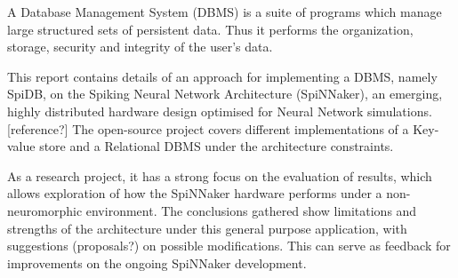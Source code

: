 A Database Management System (DBMS) is a suite of programs which manage large structured sets of persistent data.\cite{dbmsdef} Thus it performs the organization, storage, security and integrity of the user's data.

This report contains details of an approach for implementing a DBMS, namely SpiDB, on the Spiking Neural Network Architecture (SpiNNaker), an emerging, highly distributed hardware design optimised for Neural Network simulations.[reference?] The open-source project covers different implementations of a Key-value store and a Relational DBMS under the architecture constraints.

As a research project, it has a strong focus on the evaluation of results, which allows exploration of how the SpiNNaker hardware performs under a non-neuromorphic environment. The conclusions gathered show limitations and strengths of the architecture under this general purpose application, with suggestions (proposals?) on possible modifications. This can serve as feedback for improvements on the ongoing SpiNNaker development.